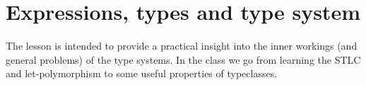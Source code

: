 \section{Expressions, types and type system}

The lesson is intended to provide a practical insight into the inner workings
(and general problems) of the type systems. In the class we go from learning
the STLC and let-polymorphism to some useful properties of typeclasses.
